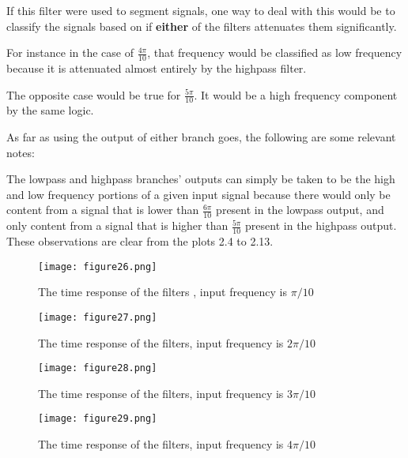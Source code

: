 \documentclass[12pt]{scrartcl} %
\begin{document}
		\vspace{5mm}
	
	If this filter were used to segment signals, one way to deal with this would be to classify the signals based on if \textbf{either} of the filters attenuates them significantly.

		\vspace{5mm}
	
	For instance in the case of $\frac{4\pi}{10}$, that frequency would be classified as low frequency because it is attenuated almost entirely by the highpass filter.

	\vspace{5mm}
	
	The opposite case would be true for $\frac{5\pi}{10}$. It would be a high frequency component by the same logic.
	
	\vspace{5mm}
	
	As far as using the output of either branch goes, the following are some relevant notes:
	
	The lowpass and highpass branches' outputs can simply be taken to be the high and low frequency portions of a given input signal because there would only be content from a signal that is lower than $\frac{6\pi}{10}$ present in the lowpass output, and only content from a signal that is higher than $\frac{5\pi}{10}$ present in the highpass output. These observations are clear from the plots 2.4 to 2.13.
	
	
		\begin{figure}[H]
			\centering
			\texttt{[image: figure26.png]}
			\caption{The time response of the filters , input frequency is $\pi/10$}
		\end{figure}
		
		\begin{figure}[H]
			\centering
			\texttt{[image: figure27.png]}
			\caption{The time response of the filters, input frequency is  $2\pi/10$}
		\end{figure}
		
		\begin{figure}[H]
			\centering
			\texttt{[image: figure28.png]}
			\caption{The time response of the filters, input frequency is  $3\pi/10$}
		\end{figure}
		
		\begin{figure}[H]
			\centering
			\texttt{[image: figure29.png]}
			\caption{The time response of the filters, input frequency is  $4\pi/10$}
		\end{figure}
		
\end{document}
